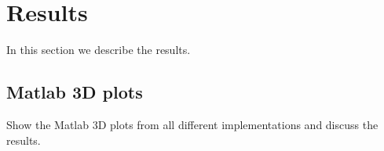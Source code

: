 \section{Results}\label{results}
In this section we describe the results.


\subsection{Matlab 3D plots}
Show the Matlab 3D plots from all different implementations and discuss the results.